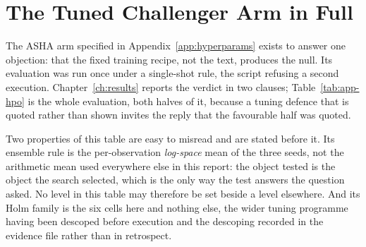\FloatBarrier
\section{The Tuned Challenger Arm in Full}
\label{app:res-hpo}

The ASHA arm specified in Appendix~\ref{app:hyperparams} exists to answer
one objection: that the fixed training recipe, not the text, produces the
null. Its evaluation was run once under a single-shot rule, the
script refusing a second execution. Chapter~\ref{ch:results} reports the
verdict in two clauses; Table~\ref{tab:app-hpo} is the whole evaluation,
both halves of it, because a tuning defence that is quoted rather than
shown invites the reply that the favourable half was quoted.

Two properties of this table are easy to misread and are stated before it.
Its ensemble rule is the per-observation \emph{log-space} mean of the three
seeds, not the arithmetic mean used everywhere else in this report: the
object tested is the object the search selected, which is the only way the
test answers the question asked. No level in this table may therefore be
set beside a level elsewhere. And its Holm family is the six cells here and
nothing else, the wider tuning programme having been descoped before
execution and the descoping recorded in the evidence file rather than in
retrospect.

